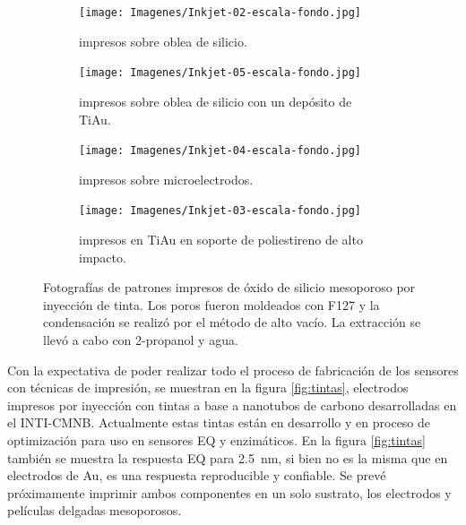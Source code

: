  	  		\begin{figure}[th]
			 	   	    \centering
			 	   	    \begin{subfigure}[t]{0.495\textwidth}
			        	\texttt{[image: Imagenes/Inkjet-02-escala-fondo.jpg]}
			        	\caption{\pdmF\space impresos sobre oblea de silicio.}
			       		\end{subfigure}
			     		\centering
			     		\begin{subfigure}[t]{0.495\textwidth}
			     		\texttt{[image: Imagenes/Inkjet-05-escala-fondo.jpg]}
			    		\caption{\pdmF\space impresos sobre oblea de silicio con un depósito de Ti\textbar Au.}
			    		\end{subfigure}
			    		\centering
			    		\begin{subfigure}[t]{0.495\textwidth}
			         	\texttt{[image: Imagenes/Inkjet-04-escala-fondo.jpg]}
			        	\caption{\pdmF\space impresos sobre microelectrodos.}
			        	\end{subfigure}
			        	\centering
			        	\begin{subfigure}[t]{0.495\textwidth}
			     		\texttt{[image: Imagenes/Inkjet-03-escala-fondo.jpg]}
 			        	\caption{\pdmF\space impresos en Ti\textbar	Au en soporte de poliestireno de alto impacto.}
			        	\end{subfigure}
			     		\caption[Electrodos impresos]{Fotografías de patrones impresos de óxido de silicio mesoporoso por inyección de tinta. Los poros fueron moldeados con F127 y la condensación se realizó por el método de alto vacío. La extracción se llevó a cabo con 2-propanol y agua.}
			     		\label{fig:flexibles}
			     	   	\end{figure}
			     	  
 	  Con la expectativa de poder realizar todo el proceso de fabricación de los sensores con técnicas de impresión, se muestran en la figura \ref{fig:tintas}, electrodos impresos por inyección con tintas a base a nanotubos de carbono desarrolladas en el INTI-CMNB. Actualmente estas tintas están en desarrollo y en proceso de optimización para uso en sensores EQ y enzimáticos\cite{Longinotti2010,Mass2016}. En la figura \ref{fig:tintas} también se muestra la respuesta EQ para \fe\space \SI{2.5}{\nm}, si bien no es la misma que en electrodos de Au, es una respuesta reproducible y confiable. Se prevé próximamente imprimir ambos componentes en un solo sustrato, los electrodos y películas delgadas mesoporosos.

